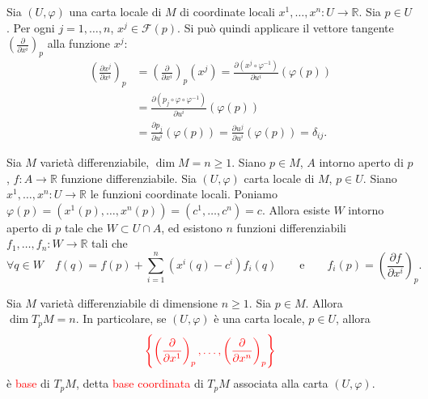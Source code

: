         \begin{osservazione}
        \mbox{}

        Sia $(U, \varphi)$ una carta locale di $M$ di coordinate locali $x^1, \dots, x^n : U \to \mathbb{R}$. Sia $p \in U$. Per ogni $j = 1, \dots, n$, $x^j \in \mathcal{F}(p)$. Si può quindi applicare il vettore tangente $\left( \frac{\partial}{\partial x^i} \right)_p$ alla funzione $x^j$:
        \begin{align*}
        \left( \frac{\partial x^j}{\partial x^i} \right)_p &= \left( \frac{\partial}{\partial x^i} \right)_p (x^j) = \frac{\partial (x^j \circ \varphi^{-1})}{\partial u^i} (\varphi(p)) \\
        &= \frac{\partial (p_j \circ \varphi \circ \varphi^{-1})}{\partial u^i} (\varphi(p)) \\
        &= \frac{\partial p_j}{\partial u^i} (\varphi(p)) = \frac{\partial u^j}{\partial u^i} (\varphi(p)) = \delta_{ij}.
        \end{align*}
        \end{osservazione}

        \begin{lemma}
        \mbox{}

        Sia $M$ varietà differenziabile, $\dim M = n \geq 1$. Siano $p \in M$, $A$ intorno aperto di $p$, $f : A \to \mathbb{R}$ funzione differenziabile. Sia $(U, \varphi)$ carta locale di $M$, $p \in U$. Siano $x^1, \dots, x^n : U \to \mathbb{R}$ le funzioni coordinate locali. Poniamo $\varphi(p) = (x^1(p), \dots, x^n(p)) = (c^1, \dots, c^n) = c$.
        Allora esiste $W$ intorno aperto di $p$ tale che $W \subset U \cap A$, ed esistono $n$ funzioni differenziabili $f_1, \dots, f_n : W \to \mathbb{R}$ tali che
        \[
        \forall q \in W \quad f(q) = f(p) + \sum_{i=1}^n (x^i(q) - c^i) f_i(q) \qquad \text{e} \qquad f_i(p) = \left( \frac{\partial f}{\partial x^i} \right)_p.
        \]
        \end{lemma}

        \begin{teorema}
        \mbox{}

        Sia $M$ varietà differenziabile di dimensione $n \geq 1$. Sia $p \in M$. Allora $\dim T_p M = n$.
        In particolare, se $(U, \varphi)$ è una carta locale, $p \in U$, allora
        \[
        \textcolor{red}{\left\{ \left( \frac{\partial}{\partial x^1} \right)_p, \dots, \left( \frac{\partial}{\partial x^n} \right)_p \right\}}
        \]
        è \textcolor{red}{base} di $T_p M$, detta \textcolor{red}{base coordinata} di $T_p M$ associata alla carta $(U, \varphi)$.
        \end{teorema}

